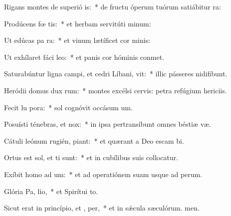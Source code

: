 \item Rigans montes de superió is:~* de fructu óperum tuórum satiábitur ra:
\item Prodúcens fœ tis:~* et herbam servitúti minum:
\item Ut edúcas pa  ra:~* et vinum lætíficet cor minis:
\item Ut exhílaret fáci  leo:~* et panis cor hóminis conmet.
\item Saturabúntur ligna campi, et cedri Líbani,  vit:~* illic pásseres nidifibunt.
\item Heródii domus dux  rum:~* montes excélsi cervis: petra refúgium hericiis.
\item Fecit lu  pora:~* sol cognóvit occásum um.
\item Posuísti ténebras, et   nox:~* in ipsa pertransíbunt omnes béstiæ væ.
\item Cátuli leónum rugién,  piant:~* et quærant a Deo escam bi.
\item Ortus est sol, et ti sunt:~* et in cubílibus suis collocatur.
\item Exíbit homo ad  um:~* et ad operatiónem suam usque ad perum.
\item Glória Pa,  lio,~* et Spirítui to.
\item Sicut erat in princípio, et ,  per,~* et in sǽcula sæculórum. men.

